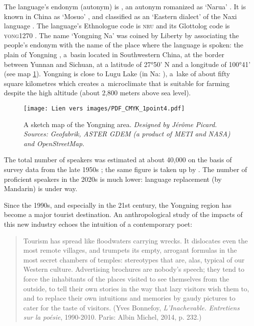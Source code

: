 The language's endonym (autonym) is , an autonym romanized as ‘Narua’ \parencite{dobbs_ortho_2018}. It is known in China as ‘Mosuo’ , and classified as an ‘Eastern dialect’ of the Naxi language \parencite[107]{heetal1985}. The language’s Ethnologue code is \textsc{nru} \parencite{lewisetal2016} and its Glottolog code is \textsc{yong1270} \parencite{Nordhoff2012}. The name ‘Yongning Na’ was coined by Liberty \textcite{lidz2006} by associating the people's {endonym} with the name of the place where the language is spoken:
the plain of Yongning , a~basin located in Southwestern China, at the border between Yunnan and Sichuan, at a latitude of 27°50’ N and a longitude of 100°41’ (see map \ref{map:1-1}). Yongning is close to Lugu Lake  (in Na: ), a~lake of about fifty square kilometres which creates a~microclimate that is suitable for farming despite the high altitude (about 2,800 meters above sea level).

\begin{figure}
	\centering
	\caption{A sketch map of the Yongning area. \emph{Designed by Jérôme Picard. Sources: Geofabrik, ASTER GDEM (a product of METI and NASA) and OpenStreetMap.}}
	\texttt{[image: Lien vers images/PDF\_CMYK\_1point4.pdf]}
	\label{map:1-1}
\end{figure}

The total number of speakers was estimated at about 40,000 on the basis of survey data from the late 1950s \parencite[107]{heetal1985}; the same figure is taken up by \parencite{yang2009}. The number of proficient speakers in the 2020s is much lower: language replacement (by Mandarin) is under way.

Since the 1990s, and especially in the 21st century, the Yongning region has become a major tourist destination. An anthropological study of the impacts of this new industry \parencite{milan_tourisme_2019} echoes the intuition of a contemporary poet:

\begin{quote}
    Tourism has spread like floodwaters carrying wrecks. It dislocates even the most remote villages, and trumpets its empty, arrogant formulas in the most secret chambers of temples: stereotypes that are, alas, typical of our Western culture. Advertising brochures are nobody's speech; they tend to force the inhabitants of the places visited to see themselves from the outside, to tell their own stories in the way that lazy visitors wish them to, and to replace their own intuitions and memories by gaudy pictures to cater for the taste of visitors. (Yves Bonnefoy, \emph{L'Inachevable. Entretiens sur la poésie}, 1990-2010. Paris: Albin Michel, 2014, p. 232.)
\end{quote}

